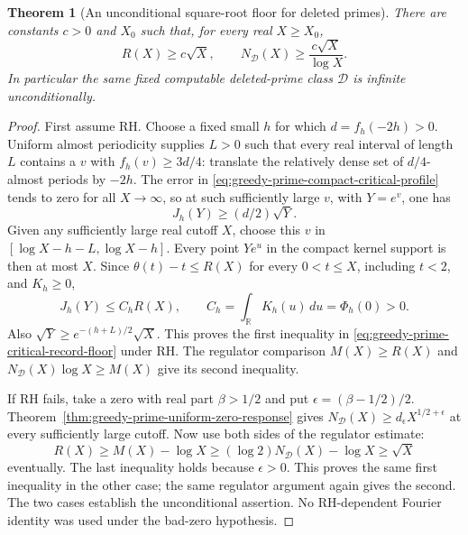 \documentclass[11pt]{article}
\newtheorem{theorem}{Theorem}[section]
\theoremstyle{definition}
\begin{document}
\begin{theorem}[An unconditional square-root floor for deleted primes]
\label{thm:greedy-prime-critical-record-floor}
There are constants $c>0$ and $X_0$ such that, for every real
$X\ge X_0$,
\begin{equation}
              R(X)\ge c\sqrt X,\qquad
              N_{\mathcal D}(X)\ge\frac{c\sqrt X}{\log X}.
 \label{eq:greedy-prime-critical-record-floor}
\end{equation}
In particular the same fixed computable deleted-prime class
$\mathcal D$ is infinite unconditionally.
\end{theorem}

\begin{proof}
First assume RH. Choose a fixed small $h$ for which
$d=f_h(-2h)>0$.
Uniform almost periodicity supplies $L>0$ such that every real
interval of length $L$ contains a $v$ with $f_h(v)\ge3d/4$:
translate the relatively dense set of $d/4$-almost periods by $-2h$.
The error in
\eqref{eq:greedy-prime-compact-critical-profile} tends to zero
for all $X\to\infty$, so at such sufficiently large $v$, with
$Y=e^v$, one has
\[
                         J_h(Y)\ge(d/2)\sqrt Y .
\]
Given any sufficiently large real cutoff $X$, choose this $v$ in
$[\log X-h-L,\log X-h]$.
Every point $Ye^u$ in the compact kernel support is then at most $X$.
Since $\theta(t)-t\le R(X)$ for every $0<t\le X$, including $t<2$,
and $K_h\ge0$,
\[
 J_h(Y)\le C_h R(X),\qquad
 C_h=\int_{\mathbb R}K_h(u)\,du=\Phi_h(0)>0.
\]
Also $\sqrt Y\ge e^{-(h+L)/2}\sqrt X$.
This proves the first inequality in
\eqref{eq:greedy-prime-critical-record-floor} under RH.
The regulator comparison $M(X)\ge R(X)$ and
$N_{\mathcal D}(X)\log X\ge M(X)$ give its second inequality.

If RH fails, take a zero with real part $\beta>1/2$ and put
$\epsilon=(\beta-1/2)/2$.
Theorem~\ref{thm:greedy-prime-uniform-zero-response} gives
$N_{\mathcal D}(X)\ge d_\epsilon X^{1/2+\epsilon}$
at every sufficiently large cutoff.
Now use both sides of the regulator estimate:
\[
 R(X)\ge M(X)-\log X
       \ge(\log2)N_{\mathcal D}(X)-\log X
       \ge \sqrt X
\]
eventually. The last inequality holds because $\epsilon>0$.
This proves the same first inequality in the other case;
the same regulator argument again gives the second.
The two cases establish the unconditional assertion.
No RH-dependent Fourier identity was used under the bad-zero
hypothesis.
\end{proof}
\end{document}
